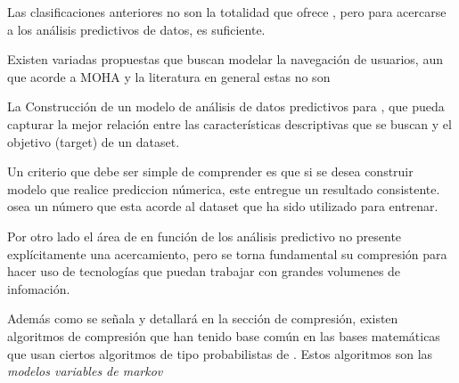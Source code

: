 Las clasificaciones anteriores no son la totalidad que ofrece \machinelearning, pero para acercarse a los análisis predictivos de datos, es suficiente.








Existen variadas propuestas que buscan modelar la navegación de usuarios, aun que acorde a MOHA y la literatura en general estas no son \online













La Construcción de un modelo de análisis de datos predictivos para \machinelearning, que pueda capturar  la mejor relación entre las características descriptivas que se buscan y el objetivo (target) de un dataset.

Un criterio que debe ser simple de comprender es que si se desea construir modelo que realice prediccion númerica, este entregue un resultado consistente. osea un número que esta acorde al dataset que ha sido utilizado para entrenar.





Por otro lado el área de \losslessdatacompression en función de los análisis predictivo no presente explícitamente una acercamiento, pero se torna fundamental su compresión para hacer uso de tecnologías que puedan trabajar con grandes volumenes de infomación.




Además como se señala y detallará en la sección de compresión, existen algoritmos de compresión que han tenido base común en las bases matemáticas que usan ciertos algoritmos de tipo probabilistas de \machinelearning. Estos algoritmos son las \emph{modelos variables de markov}










